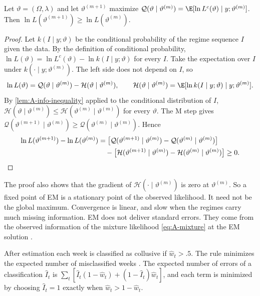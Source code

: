 \begin{proposition}\label{prop:A-em-monotone}
Let $\vartheta = (\Omega, \lambda)$ and let $\vartheta^{(m+1)}$ maximize
$\mathcal{Q}(\vartheta \mid \vartheta^{(m)}) = \E[\ln L^c(\vartheta) \mid y;\vartheta^{(m)}]$. Then
$\ln L(\vartheta^{(m+1)}) \ge \ln L(\vartheta^{(m)})$.
\end{proposition}

\begin{proof}
Let $k(I \mid y;\vartheta)$ be the conditional probability of the regime sequence $I$ given the data. By the definition of
conditional probability, $\ln L(\vartheta) = \ln L^c(\vartheta) - \ln k(I \mid y;\vartheta)$ for every $I$. Take the expectation
over $I$ under $k(\cdot \mid y;\vartheta^{(m)})$. The left side does not depend on $I$, so
\begin{equation*}
  \ln L(\vartheta) = \mathcal{Q}(\vartheta \mid \vartheta^{(m)}) - \mathcal{H}(\vartheta \mid \vartheta^{(m)}),
  \qquad
  \mathcal{H}(\vartheta \mid \vartheta^{(m)}) = \E[\ln k(I \mid y;\vartheta) \mid y;\vartheta^{(m)}].
\end{equation*}
By \cref{lem:A-info-inequality} applied to the conditional distribution of $I$, $\mathcal{H}(\vartheta \mid \vartheta^{(m)}) \le
\mathcal{H}(\vartheta^{(m)} \mid \vartheta^{(m)})$ for every $\vartheta$. The M step gives $\mathcal{Q}(\vartheta^{(m+1)} \mid
\vartheta^{(m)}) \ge \mathcal{Q}(\vartheta^{(m)} \mid \vartheta^{(m)})$. Hence
\begin{align*}
  \ln L(\vartheta^{(m+1)}) - \ln L(\vartheta^{(m)})
  &= \big[\mathcal{Q}(\vartheta^{(m+1)} \mid \vartheta^{(m)}) - \mathcal{Q}(\vartheta^{(m)} \mid \vartheta^{(m)})\big] \\
  &\quad - \big[\mathcal{H}(\vartheta^{(m+1)} \mid \vartheta^{(m)}) - \mathcal{H}(\vartheta^{(m)} \mid \vartheta^{(m)})\big]
  \ge 0. \qedhere
\end{align*}
\end{proof}

The proof also shows that the gradient of $\mathcal{H}(\cdot \mid \vartheta^{(m)})$ is zero at $\vartheta^{(m)}$. So a fixed point
of EM is a stationary point of the observed likelihood. It need not be the global maximum. Convergence is linear, and slow
when the regimes carry much missing information. EM does not deliver standard errors. They come from the observed
information of the mixture likelihood \eqref{eq:A-mixture} at the EM solution \citep{Louis1982}.

After estimation each week is classified as collusive if $\hat w_t > .5$. The rule minimizes the expected number of
misclassified weeks \citep{LeePorter1984}. The expected number of errors of a classification $\hat I_t$ is
$\sum_t[\hat I_t(1 - \hat w_t) + (1 - \hat I_t)\hat w_t]$, and each term is minimized by choosing $\hat I_t = 1$ exactly when
$\hat w_t > 1 - \hat w_t$.

